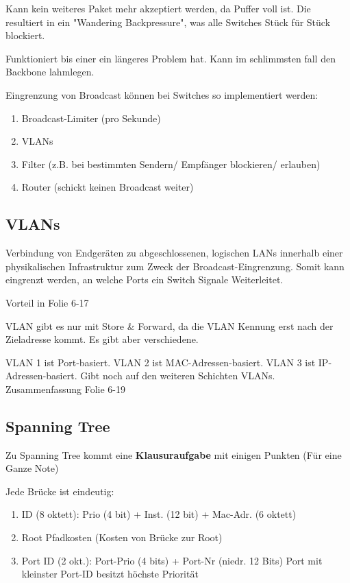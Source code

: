 \documentclass[a4paper]{article}
\begin{document}
Kann kein weiteres Paket mehr akzeptiert werden, da Puffer voll ist. Die resultiert in ein "Wandering Backpressure", was alle Switches Stück für Stück blockiert.

Funktioniert bis einer ein längeres Problem hat. Kann im schlimmsten fall den Backbone lahmlegen.

Eingrenzung von Broadcast können bei Switches so implementiert werden:

\begin{enumerate}
    \item Broadcast-Limiter (pro Sekunde)
    \item VLANs
    \item Filter (z.B. bei bestimmten Sendern/ Empfänger blockieren/ erlauben)
    \item Router (schickt keinen Broadcast weiter)
\end{enumerate}

\subsection{VLANs}

Verbindung von Endgeräten zu abgeschlossenen, logischen LANs innerhalb einer physikalischen Infrastruktur zum Zweck der Broadcast-Eingrenzung. Somit kann eingrenzt werden, an welche Ports ein Switch Signale Weiterleitet.

Vorteil in Folie 6-17

VLAN gibt es nur mit Store \& Forward, da die VLAN Kennung erst nach der Zieladresse kommt. Es gibt aber verschiedene.

VLAN 1 ist Port-basiert. VLAN 2 ist MAC-Adressen-basiert. VLAN 3 ist IP-Adressen-basiert. Gibt noch auf den weiteren Schichten VLANs. Zusammenfassung Folie 6-19



\subsection{Spanning Tree}

Zu Spanning Tree kommt eine \textbf{Klausuraufgabe} mit einigen Punkten (Für eine Ganze Note)

Jede Brücke ist eindeutig:

\begin{enumerate}
    \item ID (8 oktett): Prio (4 bit) + Inst. (12 bit) + Mac-Adr. (6 oktett)
    \item Root Pfadkosten (Kosten von Brücke zur Root)
    \item Port ID (2 okt.): Port-Prio (4 bits) + Port-Nr (niedr. 12 Bits) Port mit kleinster Port-ID besitzt höchste Priorität
\end{enumerate}
\end{document}
